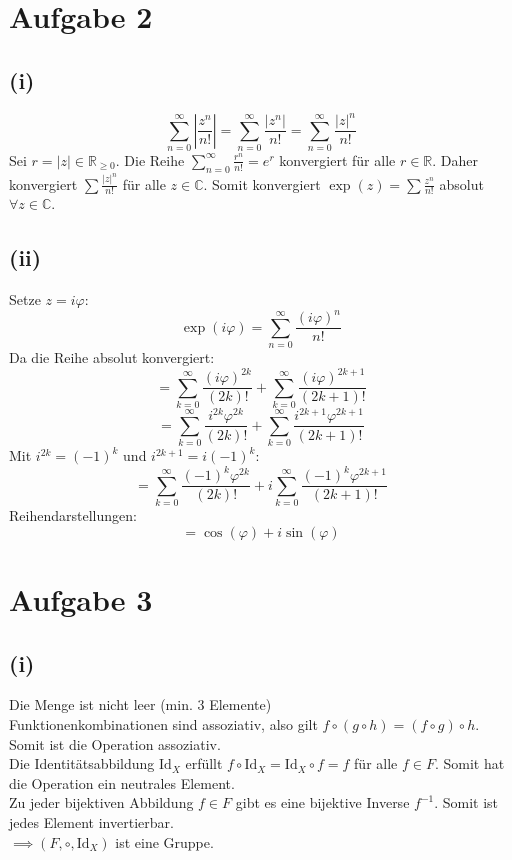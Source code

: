 \documentclass{article}
\begin{document}
\section*{Aufgabe 2}

\subsection*{(i)}
\[ \sum_{n=0}^{\infty} \left| \frac{z^n}{n!} \right| = \sum_{n=0}^{\infty} \frac{|z^n|}{n!} = \sum_{n=0}^{\infty} \frac{|z|^n}{n!} \]
Sei $r = |z| \in \mathbb{R}_{\ge 0}$. Die Reihe $\sum_{n=0}^{\infty} \frac{r^n}{n!} = e^r$ konvergiert für alle $r \in \mathbb{R}$.
Daher konvergiert $\sum \frac{|z|^n}{n!}$ für alle $z \in \mathbb{C}$.
Somit konvergiert $\exp(z) = \sum \frac{z^n}{n!}$ absolut $\forall z \in \mathbb{C}$.

\subsection*{(ii)}
Setze $z=i\varphi$:
\[ \exp(i\varphi) = \sum_{n=0}^{\infty} \frac{(i\varphi)^n}{n!} \]
Da die Reihe absolut konvergiert:
\[ = \sum_{k=0}^{\infty} \frac{(i\varphi)^{2k}}{(2k)!} + \sum_{k=0}^{\infty} \frac{(i\varphi)^{2k+1}}{(2k+1)!} \]
\[ = \sum_{k=0}^{\infty} \frac{i^{2k}\varphi^{2k}}{(2k)!} + \sum_{k=0}^{\infty} \frac{i^{2k+1}\varphi^{2k+1}}{(2k+1)!} \]
Mit $i^{2k} = (-1)^k$ und $i^{2k+1} = i(-1)^k$:
\[ = \sum_{k=0}^{\infty} \frac{(-1)^k \varphi^{2k}}{(2k)!} + i \sum_{k=0}^{\infty} \frac{(-1)^k \varphi^{2k+1}}{(2k+1)!} \]
Reihendarstellungen:
\[ = \cos(\varphi) + i \sin(\varphi) \]

\section*{Aufgabe 3}
\subsection*{(i)}
Die Menge ist nicht leer (min. 3 Elemente) \\
\newline
Funktionenkombinationen sind assoziativ, also gilt $f \circ ( g \circ h) = (f \circ g) \circ h$. Somit ist die Operation assoziativ.\\
\newline
Die Identitätsabbildung $\text{Id}_X$ erfüllt $f \circ \text{Id}_X = \text{Id}_X \circ f = f$ für alle $f \in F$. Somit hat die Operation ein neutrales Element. \\
\newline
Zu jeder bijektiven Abbildung $f \in F$ gibt es eine bijektive Inverse $f^{-1}$. Somit ist jedes Element invertierbar. \\
\newline
$\implies (F, \circ, \text{Id}_X)$ ist eine Gruppe. 
\end{document}
